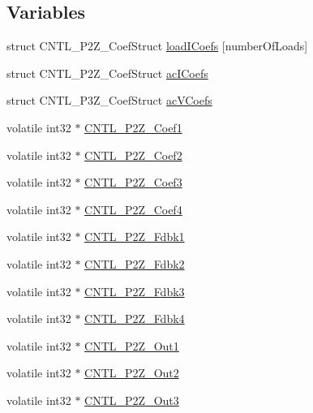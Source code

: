 \subsection*{Variables}
\begin{DoxyCompactItemize}
\item 
struct C\-N\-T\-L\-\_\-P2\-Z\-\_\-\-Coef\-Struct \hyperlink{a00014_af15987bb0b6b0819b233fa6963671a35}{load\-I\-Coefs} \mbox{[}number\-Of\-Loads\mbox{]}
\item 
struct C\-N\-T\-L\-\_\-P2\-Z\-\_\-\-Coef\-Struct \hyperlink{a00014_a05ea1ba581ea8bf1eb5c44f15534d31c}{ac\-I\-Coefs}
\item 
struct C\-N\-T\-L\-\_\-P3\-Z\-\_\-\-Coef\-Struct \hyperlink{a00014_a1b7cdba3e3e2fb71309dd78c6c1cd4cc}{ac\-V\-Coefs}
\item 
volatile int32 $\ast$ \hyperlink{a00014_a047c759a71b80d8cfd5e6f52b1b021b9}{C\-N\-T\-L\-\_\-P2\-Z\-\_\-\-Coef1}
\item 
volatile int32 $\ast$ \hyperlink{a00014_abdc599cbabc62898c49926678c3327e6}{C\-N\-T\-L\-\_\-P2\-Z\-\_\-\-Coef2}
\item 
volatile int32 $\ast$ \hyperlink{a00014_a1e357d296e76299ea04d7a63e4c46d1b}{C\-N\-T\-L\-\_\-P2\-Z\-\_\-\-Coef3}
\item 
volatile int32 $\ast$ \hyperlink{a00014_afe468cb1e995b267671e88b8d292aef6}{C\-N\-T\-L\-\_\-P2\-Z\-\_\-\-Coef4}
\item 
volatile int32 $\ast$ \hyperlink{a00014_a9c0418a780375035750c3d4dc16f3ae4}{C\-N\-T\-L\-\_\-P2\-Z\-\_\-\-Fdbk1}
\item 
volatile int32 $\ast$ \hyperlink{a00014_a6092ef1c1c54802bb5e11564f782390d}{C\-N\-T\-L\-\_\-P2\-Z\-\_\-\-Fdbk2}
\item 
volatile int32 $\ast$ \hyperlink{a00014_a939782d23ddbf7f45e5e393a65bafcff}{C\-N\-T\-L\-\_\-P2\-Z\-\_\-\-Fdbk3}
\item 
volatile int32 $\ast$ \hyperlink{a00014_a6937e965f3ae840ea6ee43cce410680f}{C\-N\-T\-L\-\_\-P2\-Z\-\_\-\-Fdbk4}
\item 
volatile int32 $\ast$ \hyperlink{a00014_a84d7c096ca668d1edc5e4fa54abe5d98}{C\-N\-T\-L\-\_\-P2\-Z\-\_\-\-Out1}
\item 
volatile int32 $\ast$ \hyperlink{a00014_ae6679b66ffeca93742f973a2c947855f}{C\-N\-T\-L\-\_\-P2\-Z\-\_\-\-Out2}
\item 
volatile int32 $\ast$ \hyperlink{a00014_a11dcb9f6b6d03fe960ddf790e1ad5ed2}{C\-N\-T\-L\-\_\-P2\-Z\-\_\-\-Out3}
\item 

\end{DoxyCompactItemize}
